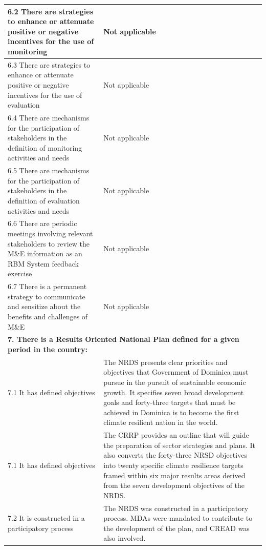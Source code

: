 \documentclass[
  10pt,
]{book}
\begin{document}
\begin{table}
\begin{tabular}[t]{l|l}
\hline
\hspace{1em}6.2 There are strategies to enhance or attenuate positive or negative incentives for the use of monitoring & Not applicable\\
\hline
\hspace{1em}6.3 There are strategies to enhance or attenuate positive or negative incentives for the use of evaluation & Not applicable\\
\hline
\hspace{1em}6.4 There are mechanisms for the participation of stakeholders in the definition of monitoring activities and needs & Not applicable\\
\hline
\hspace{1em}6.5 There are mechanisms for the participation of stakeholders in the definition of evaluation activities and needs & Not applicable\\
\hline
\hspace{1em}6.6 There are periodic meetings involving relevant stakeholders to review the M\&E information as an RBM System feedback exercise & Not applicable\\
\hline
\hspace{1em}6.7 There is a permanent strategy to communicate and sensitize about the benefits and challenges of M\&E & Not applicable\\
\hline
\multicolumn{2}{l}{\textbf{7. There is a Results Oriented National Plan defined for a given period in the country:}}\\
\hline
\hspace{1em}7.1 It has defined objectives & The NRDS presents clear priorities and objectives that Government of Dominica must pursue in the pursuit of sustainable economic growth. It specifies seven broad development goals and forty-three targets that must be achieved in Dominica is to become the first climate resilient nation in the world.\\
\hline
\hspace{1em}7.1 It has defined objectives & The CRRP provides an outline that will guide the preparation of sector strategies and plans. It also converts the forty-three NRSD objectives into twenty specific climate resilience targets framed within six major results areas derived from the seven development objectives of the NRDS.\\
\hline
\hspace{1em}7.2 It is constructed in a participatory process & The NRDS was constructed in a participatory process. MDAs were mandated to contribute to the development of the plan, and CREAD was also involved.\\

\end{tabular}
\end{table}
\end{document}
